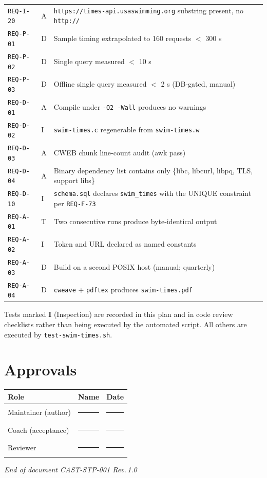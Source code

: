 \documentclass[12pt]{article}
\newcommand{\code}[1]{\texttt{#1}}
\newcommand{\req}[1]{\texttt{#1}}
\begin{document}
\begin{center}
\begin{longtable}{p{2.6cm}p{1.0cm}p{8.4cm}}
  \req{REQ-I-20}    & A & \code{https://times-api.usaswimming.org} substring present, no \code{http://} \\
  \req{REQ-P-01}    & D & Sample timing extrapolated to 160 requests $<$ 300 s        \\
  \req{REQ-P-02}    & D & Single query measured $<$ 10 s                              \\
  \req{REQ-P-03}    & D & Offline single query measured $<$ 2 s (DB-gated, manual)    \\
  \req{REQ-D-01}    & A & Compile under \code{-O2 -Wall} produces no warnings         \\
  \req{REQ-D-02}    & I & \code{swim-times.c} regenerable from \code{swim-times.w}    \\
  \req{REQ-D-03}    & A & CWEB chunk line-count audit (awk pass)                     \\
  \req{REQ-D-04}    & A & Binary dependency list contains only \{libc, libcurl, libpq, TLS, support libs\} \\
  \req{REQ-D-10}    & I & \texttt{schema.sql} declares \texttt{swim\_times} with the UNIQUE constraint per \req{REQ-F-73} \\
  \req{REQ-A-01}    & T & Two consecutive runs produce byte-identical output         \\
  \req{REQ-A-02}    & I & Token and URL declared as named constants                   \\
  \req{REQ-A-03}    & D & Build on a second POSIX host (manual; quarterly)           \\
  \req{REQ-A-04}    & D & \code{cweave} + \code{pdftex} produces \code{swim-times.pdf} \\
  \bottomrule
\end{longtable}
\end{center}

\noindent
Tests marked \textbf{I} (Inspection) are recorded in this plan and
in code review checklists rather than being executed by the
automated script.  All others are executed by
\code{test-swim-times.sh}.

\section{Approvals}

\begin{center}
\begin{tabular}{lll}
  \toprule
  \textbf{Role}                & \textbf{Name}            & \textbf{Date}  \\
  \midrule
  Maintainer (author)          & \rule{4cm}{0.4pt}        & \rule{2cm}{0.4pt} \\
  Coach (acceptance)           & \rule{4cm}{0.4pt}        & \rule{2cm}{0.4pt} \\
  Reviewer                     & \rule{4cm}{0.4pt}        & \rule{2cm}{0.4pt} \\
  \bottomrule
\end{tabular}
\end{center}

\vfill
\begin{center}
  \small\textit{End of document CAST-STP-001 Rev.\,1.0}
\end{center}
\end{document}
